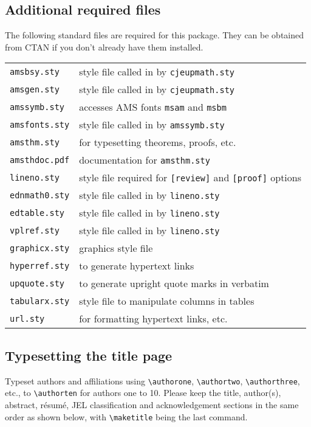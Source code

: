 \documentclass{cje}          %
\theoremstyle{plain}%
\theoremstyle{definition}
\theoremstyle{remark}
\begin{document}
\subsection{Additional required files}
The following standard files are required for this package. They can be obtained from CTAN if you don't already have them installed.\\[0.5\baselineskip]
\begin{tabular}{@{}ll}
\texttt{amsbsy.sty}        & style file called in by \texttt{cjeupmath.sty}\\
\texttt{amsgen.sty}        & style file called in by \texttt{cjeupmath.sty}\\
\texttt{amssymb.sty}       & accesses AMS fonts \texttt{msam} and \texttt{msbm}\\
\texttt{amsfonts.sty}      & style file called in by \texttt{amssymb.sty}\\
\texttt{amsthm.sty}        & for typesetting theorems, proofs, etc.\\
\texttt{amsthdoc.pdf}      & documentation for \texttt{amsthm.sty}\\
\texttt{lineno.sty}        & style file required for \verb"[review]" and \verb"[proof]" options\\
\texttt{ednmath0.sty}      & style file called in by \texttt{lineno.sty}\\
\texttt{edtable.sty}       & style file called in by \texttt{lineno.sty}\\
\texttt{vplref.sty}        & style file called in by \texttt{lineno.sty}\\
\texttt{graphicx.sty}      & graphics style file\\
\texttt{hyperref.sty}      & to generate hypertext links\\
\texttt{upquote.sty}       & to generate upright quote marks in verbatim\\
\texttt{tabularx.sty}      & style file to manipulate columns in tables\\
\texttt{url.sty}           & for formatting hypertext links, etc.
\end{tabular}

\subsection{Typesetting the title page}

Typeset authors and affiliations using \verb"\authorone", \verb"\authortwo", \verb"\authorthree", etc.,  to \verb"\authorten" for authors one to 10. Please keep the title, author(s), abstract, r\'{e}sum\'{e}, JEL classification and acknowledgement sections in the same order as shown below, with \verb"\maketitle" being the last command. 
\end{document}
